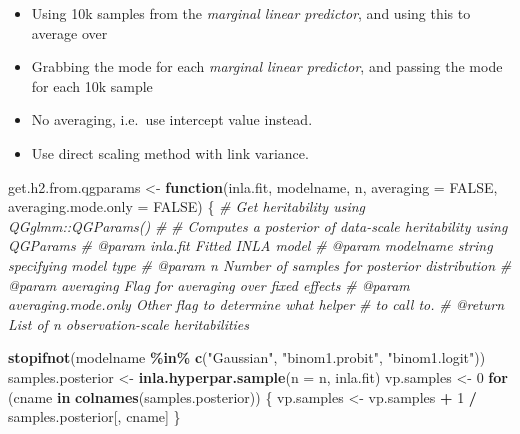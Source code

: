\documentclass[
]{article}
\newenvironment{Shaded}{\begin{snugshade}}{\end{snugshade}}
\newcommand{\AttributeTok}[1]{\textcolor[rgb]{0.13,0.29,0.53}{#1}}
\newcommand{\CommentTok}[1]{\textcolor[rgb]{0.56,0.35,0.01}{\textit{#1}}}
\newcommand{\ConstantTok}[1]{\textcolor[rgb]{0.56,0.35,0.01}{#1}}
\newcommand{\ControlFlowTok}[1]{\textcolor[rgb]{0.13,0.29,0.53}{\textbf{#1}}}
\newcommand{\DecValTok}[1]{\textcolor[rgb]{0.00,0.00,0.81}{#1}}
\newcommand{\FunctionTok}[1]{\textcolor[rgb]{0.13,0.29,0.53}{\textbf{#1}}}
\newcommand{\NormalTok}[1]{#1}
\newcommand{\OtherTok}[1]{\textcolor[rgb]{0.56,0.35,0.01}{#1}}
\newcommand{\SpecialCharTok}[1]{\textcolor[rgb]{0.81,0.36,0.00}{\textbf{#1}}}
\newcommand{\StringTok}[1]{\textcolor[rgb]{0.31,0.60,0.02}{#1}}
\providecommand{\tightlist}{%
  \setlength{\itemsep}{0pt}\setlength{\parskip}{0pt}}
\begin{document}
\begin{itemize}
\tightlist
\item
  Using 10k samples from the \emph{marginal linear predictor}, and using
  this to average over
\item
  Grabbing the mode for each \emph{marginal linear predictor}, and
  passing the mode for each 10k sample
\item
  No averaging, i.e.~use intercept value instead.
\item
  Use direct scaling method with link variance.
\end{itemize}

\begin{Shaded}
\begin{Highlighting}[]
\NormalTok{get.h2.from.qgparams }\OtherTok{\textless{}{-}} \ControlFlowTok{function}\NormalTok{(inla.fit,}
\NormalTok{                                 modelname,}
\NormalTok{                                 n,}
                                 \AttributeTok{averaging =} \ConstantTok{FALSE}\NormalTok{,}
                                 \AttributeTok{averaging.mode.only =} \ConstantTok{FALSE}\NormalTok{) \{}
  \CommentTok{\#\textquotesingle{} Get heritability using QGglmm::QGParams()}
  \CommentTok{\#\textquotesingle{}}
  \CommentTok{\#\textquotesingle{} Computes a posterior of data{-}scale heritability using QGParams}
  \CommentTok{\#\textquotesingle{} @param inla.fit Fitted INLA model}
  \CommentTok{\#\textquotesingle{} @param modelname string specifying model type}
  \CommentTok{\#\textquotesingle{} @param n Number of samples for posterior distribution}
  \CommentTok{\#\textquotesingle{} @param averaging Flag for averaging over fixed effects}
  \CommentTok{\#\textquotesingle{} @param averaging.mode.only Other flag to determine what helper}
  \CommentTok{\#\textquotesingle{} to call to.}
  \CommentTok{\#\textquotesingle{} @return List of n observation{-}scale heritabilities}

  \FunctionTok{stopifnot}\NormalTok{(modelname }\SpecialCharTok{\%in\%} \FunctionTok{c}\NormalTok{(}\StringTok{"Gaussian"}\NormalTok{, }\StringTok{"binom1.probit"}\NormalTok{,}
                             \StringTok{"binom1.logit"}\NormalTok{))}
\NormalTok{  samples.posterior }\OtherTok{\textless{}{-}} \FunctionTok{inla.hyperpar.sample}\NormalTok{(}\AttributeTok{n =}\NormalTok{ n, inla.fit)}
\NormalTok{  vp.samples }\OtherTok{\textless{}{-}} \DecValTok{0}
  \ControlFlowTok{for}\NormalTok{ (cname }\ControlFlowTok{in} \FunctionTok{colnames}\NormalTok{(samples.posterior)) \{}
\NormalTok{    vp.samples }\OtherTok{\textless{}{-}}\NormalTok{ vp.samples }\SpecialCharTok{+} \DecValTok{1} \SpecialCharTok{/}\NormalTok{ samples.posterior[, cname]}
\NormalTok{  \}}


\end{Highlighting}
\end{Shaded}
\end{document}
